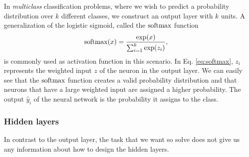 In \emph{multiclass} classification problems, where we wish to predict a probability distribution over $k$ different classes, we construct an output layer with $k$ units. A generalization of the logistic sigmoid, called the $\operatorname{softmax}$ function
\begin{equation}\label{eq:softmax}
\operatorname{softmax}(x) = \frac{\exp(x)}{\sum_{i=1}^{k}\exp(z_i)},
\end{equation}
is commonly used as activation function in this scenario. In Eq. \eqref{eq:softmax}, $z_i$ represents the weighted input $z$ of the  neuron in the output layer. We can easily see that the $\operatorname{softmax}$ function creates a valid probability distribution and that neurons that have a large weighted input are assigned a higher probability. The output $\hat{y}_i$ of the neural network is the probability it assigns to the  class.

\subsubsection{Hidden layers}
In contrast to the output layer, the task that we want so solve does not give us any information about how to design the hidden layers. 